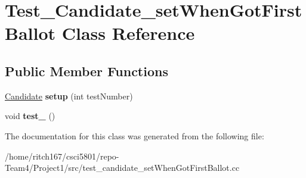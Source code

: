 \hypertarget{classTest__Candidate__setWhenGotFirstBallot}{}\section{Test\+\_\+\+Candidate\+\_\+set\+When\+Got\+First\+Ballot Class Reference}
\label{classTest__Candidate__setWhenGotFirstBallot}
\subsection*{Public Member Functions}
\begin{DoxyCompactItemize}
\item 
\mbox{\label{classTest__Candidate__setWhenGotFirstBallot_a43cbab7c606d04649b78979b4990dacc}} 
\hyperlink{classCandidate}{Candidate} {\bfseries setup} (int test\+Number)
\item 
\mbox{\label{classTest__Candidate__setWhenGotFirstBallot_af318bab921556663a60da093433a69c9}} 
void {\bfseries test\+\_} ()
\end{DoxyCompactItemize}


The documentation for this class was generated from the following file\+:\begin{DoxyCompactItemize}
\item 
/home/ritch167/csci5801/repo-\/\+Team4/\+Project1/src/test\+\_\+candidate\+\_\+set\+When\+Got\+First\+Ballot.\+cc\end{DoxyCompactItemize}
